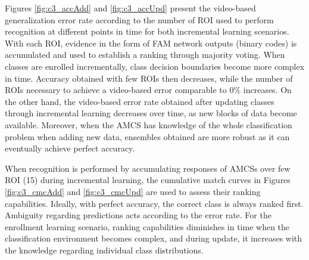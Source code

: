 \begin{figure*}[t]
	\centering
  	\caption{Cumulative match curves obtained during the \emph{update} incremental learning scenario at different points in time when 15 ROIs are used to perform recognition.
  	Performance is shown at different points in time and error bars correspond to the 90\% confidence interval.
		During enrollment, the maximal rank increases with the number of classes present in the system}
  \label{fig:c3_cmcUpd}
\end{figure*}

Figures \ref{fig:c3_accAdd} and \ref{fig:c3_accUpd} present the video-based generalization error rate according to the number of ROI used to perform recognition at different points in time for both incremental learning scenarios.
With each ROI, evidence in the form of FAM network outputs (binary codes) is accumulated and used to establish a ranking through majority voting.
When classes are enrolled incrementally, class decision boundaries become more complex in time.
Accuracy obtained with few ROIs then decreases, while the number of ROIs necessary to achieve a video-based error comparable to 0\% increases.
On the other hand, the video-based error rate obtained after updating classes through incremental learning decreases over time, as new blocks of data become available.
Moreover, when the AMCS has knowledge of the whole classification problem when adding new data, ensembles obtained are more robust as it can eventually achieve perfect accuracy.

When recognition is performed by accumulating responses of AMCSs over few ROI (15) during incremental learning, the cumulative match curves in Figures \ref{fig:c3_cmcAdd} and \ref{fig:c3_cmcUpd} are used to assess their ranking capabilities.
Ideally, with perfect accuracy, the correct class is always ranked first.
Ambiguity regarding predictions acts according to the error rate.
For the enrollment learning scenario, ranking capabilities diminishes in time when the classification environment becomes complex, and during update, it increases with the knowledge regarding individual class distributions.

